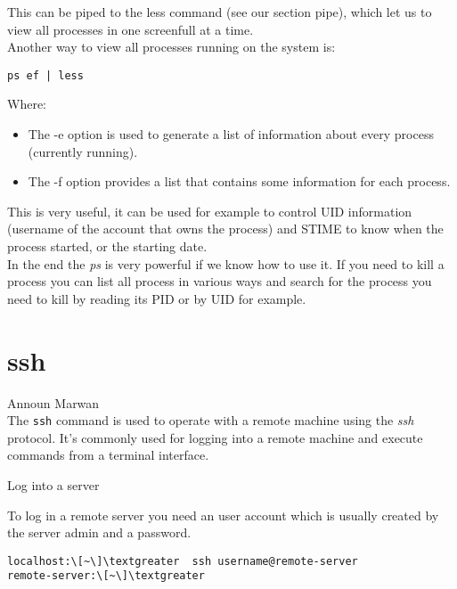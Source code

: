 \documentclass[hidelinks,12pt,a4paper,numbers=enddot]{scrartcl}
\begin{document}
This can be piped to the less command (see our section pipe), which let us to
view all processes in one screenfull at a time.\\

Another way to view all processes running on the system is:


\begin{verbatim}
ps ef | less
\end{verbatim}

Where:

\begin{itemize}
    \item The -e option is used to generate a list of information about every process
        (currently running).
     
    \item The -f option provides a list that contains some information for each process.
\end{itemize}



This is very useful, it can be used for example to control UID information (username of
the account that owns the process) and STIME to know when the process started, or
the starting date.\\


In the end the \emph{ps} is very powerful if we know how to use it.
If you need to kill a process you can list all process in various ways
and search for the process you need to kill by reading its PID or by UID for example.


\section{ssh}


\large Announ Marwan \normalsize\\



The \texttt{ssh} command is used to operate with a remote machine using
the \emph{ssh} protocol. It's commonly used for logging into a remote
machine and execute commands from a terminal interface.


Log into a server

To log in a remote server you need an user account which is
usually created by the server admin and a password.

\begin{verbatim}
localhost:\[~\]\textgreater  ssh username@remote-server
remote-server:\[~\]\textgreater 
\end{verbatim}
\end{document}
